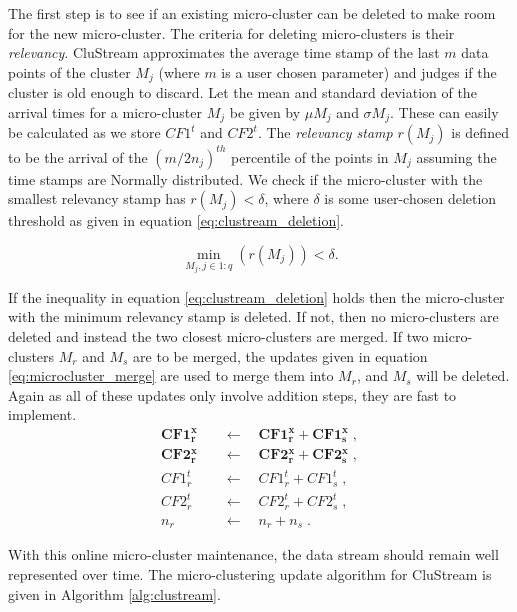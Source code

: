 The first step is to see if an existing micro-cluster can be deleted to make room for the new micro-cluster. The criteria for deleting micro-clusters is their \textit{relevancy}. CluStream approximates the average time stamp of the last $m$ data points of the cluster $M_j$ (where $m$ is a user chosen parameter) and judges if the cluster is old enough to discard.  Let the mean and standard deviation of the arrival times for a micro-cluster $M_j$ be given by $\mu M_j$ and $\sigma M_j$. These can easily be calculated as we store $CF1^t$ and $CF2^t$. The \textit{relevancy stamp} $r(M_j)$ is defined to be the arrival of the $(m/2n_j)^{th}$ percentile of the points in $M_j$ assuming the time stamps are Normally distributed. We check if the micro-cluster with the smallest relevancy stamp has $r(M_j) < \delta$, where $\delta$ is some user-chosen deletion threshold as given in equation \eqref{eq:clustream_deletion}.

\begin{equation}
  \label{eq:clustream_deletion}
 \min_{M_j , j \in 1:q}(r(M_j)) < \delta.  
\end{equation}

 If the inequality in equation \eqref{eq:clustream_deletion} holds then the  micro-cluster with the minimum relevancy stamp is deleted. If not, then no micro-clusters are deleted and instead the two closest micro-clusters are merged. If two micro-clusters $M_r$ and $M_s$ are to be merged, the updates given in equation \eqref{eq:microcluster_merge} are used to merge them into $M_r$, and $M_s$ will be deleted. Again as all of these updates only involve addition steps, they are fast to implement. 
\begin{align}
\boldsymbol{CF1^x_r} \quad &\leftarrow \quad \boldsymbol{CF1^x_r} + \boldsymbol{CF1^x_s} \; , \nonumber  \\ 
\boldsymbol{CF2^x_r} \quad &\leftarrow \quad \boldsymbol{CF2^x_r} + \boldsymbol{CF2^x_s} \; , \nonumber\\
CF1^t_r \quad &\leftarrow \quad  CF1^t_r + CF1^t_s\; , \nonumber   \\
CF2^t_r \quad &\leftarrow \quad CF2^t_r +  CF2^t_s\; , \nonumber\\
n_r  \quad &\leftarrow \quad n_r + n_s \; .
\label{eq:microcluster_merge}
\end{align}

With this online micro-cluster maintenance, the data stream should remain well represented over time. The micro-clustering update algorithm for CluStream is given in Algorithm \ref{alg:clustream}.

